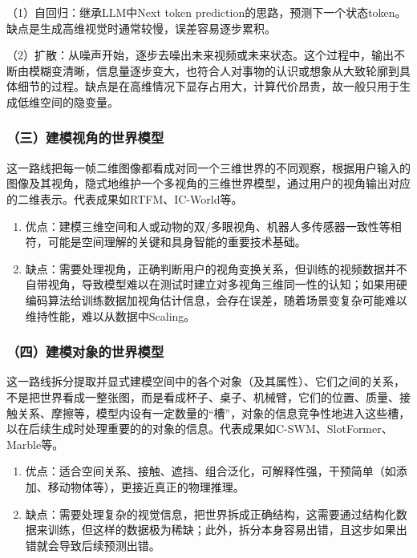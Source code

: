 （1）自回归：继承LLM中Next token prediction的思路，预测下一个状态token。缺点是生成高维视觉时通常较慢，误差容易逐步累积。

（2）扩散：从噪声开始，逐步去噪出未来视频或未来状态。这个过程中，输出不断由模糊变清晰，信息量逐步变大，也符合人对事物的认识或想象从大致轮廓到具体细节的过程。缺点是在高维情况下显存占用大，计算代价昂贵，故一般只用于生成低维空间的隐变量。

\hypertarget{ux4e09ux5efaux6a21ux89c6ux89d2ux7684ux4e16ux754cux6a21ux578b}{%
\subsubsection{（三）建模视角的世界模型}\label{ux4e09ux5efaux6a21ux89c6ux89d2ux7684ux4e16ux754cux6a21ux578b}}

这一路线把每一帧二维图像都看成对同一个三维世界的不同观察，根据用户输入的图像及其视角，隐式地维护一个多视角的三维世界模型，通过用户的视角输出对应的二维表示。代表成果如RTFM、IC-World等。

\begin{enumerate}
\def\labelenumi{\arabic{enumi}.}
\item
  优点：建模三维空间和人或动物的双/多眼视角、机器人多传感器一致性等相符，可能是空间理解的关键和具身智能的重要技术基础。
\item
  缺点：需要处理视角，正确判断用户的视角变换关系，但训练的视频数据并不自带视角，导致模型难以在测试时建立对多视角三维同一性的认知；如果用硬编码算法给训练数据加视角估计信息，会存在误差，随着场景变复杂可能难以维持性能，难以从数据中Scaling。
\end{enumerate}

\hypertarget{ux56dbux5efaux6a21ux5bf9ux8c61ux7684ux4e16ux754cux6a21ux578b}{%
\subsubsection{（四）建模对象的世界模型}\label{ux56dbux5efaux6a21ux5bf9ux8c61ux7684ux4e16ux754cux6a21ux578b}}

这一路线拆分提取并显式建模空间中的各个对象（及其属性）、它们之间的关系，不是把世界看成一整张图，而是看成杯子、桌子、机械臂，它们的位置、质量、接触关系、摩擦等，模型内设有一定数量的``槽''，对象的信息竞争性地进入这些槽，以在后续生成时处理重要的的对象的信息。代表成果如C-SWM、SlotFormer、Marble等。

\begin{enumerate}
\def\labelenumi{\arabic{enumi}.}
\item
  优点：适合空间关系、接触、遮挡、组合泛化，可解释性强，干预简单（如添加、移动物体等），更接近真正的物理推理。
\item
  缺点：需要处理复杂的视觉信息，把世界拆成正确结构，这需要通过结构化数据来训练，但这样的数据极为稀缺；此外，拆分本身容易出错，且这步如果出错就会导致后续预测出错。
\end{enumerate}

